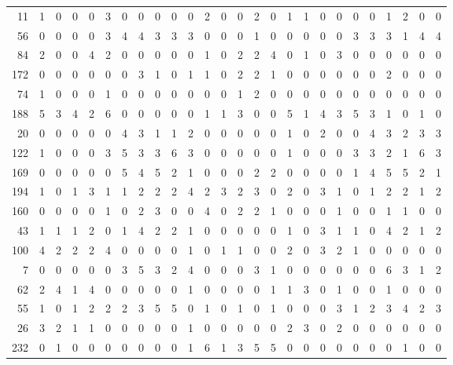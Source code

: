 \begin{longtable}{@{\extracolsep{\fill}}rccccccccccccccccccccccccc@{}}
11 & 1 & 0 & 0 & 0 & 3 & 0 & 0 & 0 & 0 & 0 & 2 & 0 & 0 & 2 & 0 & 1 & 1 & 0 & 0 & 0 & 0 & 1 & 2 & 0 & 0 \\
56 & 0 & 0 & 0 & 0 & 3 & 4 & 4 & 3 & 3 & 3 & 0 & 0 & 0 & 1 & 0 & 0 & 0 & 0 & 0 & 3 & 3 & 3 & 1 & 4 & 4 \\
84 & 2 & 0 & 0 & 4 & 2 & 0 & 0 & 0 & 0 & 0 & 1 & 0 & 2 & 2 & 4 & 0 & 1 & 0 & 3 & 0 & 0 & 0 & 0 & 0 & 0 \\
172 & 0 & 0 & 0 & 0 & 0 & 0 & 3 & 1 & 0 & 1 & 1 & 0 & 2 & 2 & 1 & 0 & 0 & 0 & 0 & 0 & 0 & 2 & 0 & 0 & 0 \\
74 & 1 & 0 & 0 & 0 & 1 & 0 & 0 & 0 & 0 & 0 & 0 & 0 & 1 & 2 & 0 & 0 & 0 & 0 & 0 & 0 & 0 & 0 & 0 & 0 & 0 \\
188 & 5 & 3 & 4 & 2 & 6 & 0 & 0 & 0 & 0 & 0 & 1 & 1 & 3 & 0 & 0 & 5 & 1 & 4 & 3 & 5 & 3 & 1 & 0 & 1 & 0 \\
20 & 0 & 0 & 0 & 0 & 0 & 4 & 3 & 1 & 1 & 2 & 0 & 0 & 0 & 0 & 0 & 1 & 0 & 2 & 0 & 0 & 4 & 3 & 2 & 3 & 3 \\
122 & 1 & 0 & 0 & 0 & 3 & 5 & 3 & 3 & 6 & 3 & 0 & 0 & 0 & 0 & 0 & 1 & 0 & 0 & 0 & 3 & 3 & 2 & 1 & 6 & 3 \\
169 & 0 & 0 & 0 & 0 & 0 & 5 & 4 & 5 & 2 & 1 & 0 & 0 & 0 & 2 & 2 & 0 & 0 & 0 & 0 & 1 & 4 & 5 & 5 & 2 & 1 \\
194 & 1 & 0 & 1 & 3 & 1 & 1 & 2 & 2 & 2 & 4 & 2 & 3 & 2 & 3 & 0 & 2 & 0 & 3 & 1 & 0 & 1 & 2 & 2 & 1 & 2 \\
160 & 0 & 0 & 0 & 0 & 1 & 0 & 2 & 3 & 0 & 0 & 4 & 0 & 2 & 2 & 1 & 0 & 0 & 0 & 1 & 0 & 0 & 1 & 1 & 0 & 0 \\
43 & 1 & 1 & 1 & 2 & 0 & 1 & 4 & 2 & 2 & 1 & 0 & 0 & 0 & 0 & 0 & 1 & 0 & 3 & 1 & 1 & 0 & 4 & 2 & 1 & 2 \\
100 & 4 & 2 & 2 & 2 & 4 & 0 & 0 & 0 & 0 & 1 & 0 & 1 & 1 & 0 & 0 & 2 & 0 & 3 & 2 & 1 & 0 & 0 & 0 & 0 & 0 \\
7 & 0 & 0 & 0 & 0 & 0 & 3 & 5 & 3 & 2 & 4 & 0 & 0 & 0 & 3 & 1 & 0 & 0 & 0 & 0 & 0 & 0 & 6 & 3 & 1 & 2 \\
62 & 2 & 4 & 1 & 4 & 0 & 0 & 0 & 0 & 0 & 1 & 0 & 0 & 0 & 0 & 1 & 1 & 3 & 0 & 1 & 0 & 0 & 1 & 0 & 0 & 0 \\
55 & 1 & 0 & 1 & 2 & 2 & 2 & 3 & 5 & 5 & 0 & 1 & 0 & 1 & 0 & 1 & 0 & 0 & 0 & 3 & 1 & 2 & 3 & 4 & 2 & 3 \\
26 & 3 & 2 & 1 & 1 & 0 & 0 & 0 & 0 & 0 & 1 & 0 & 0 & 0 & 0 & 0 & 2 & 3 & 0 & 2 & 0 & 0 & 0 & 0 & 0 & 0 \\
232 & 0 & 1 & 0 & 0 & 0 & 0 & 0 & 0 & 0 & 1 & 6 & 1 & 3 & 5 & 5 & 0 & 0 & 0 & 0 & 0 & 0 & 0 & 1 & 0 & 0 \\

\end{longtable}
